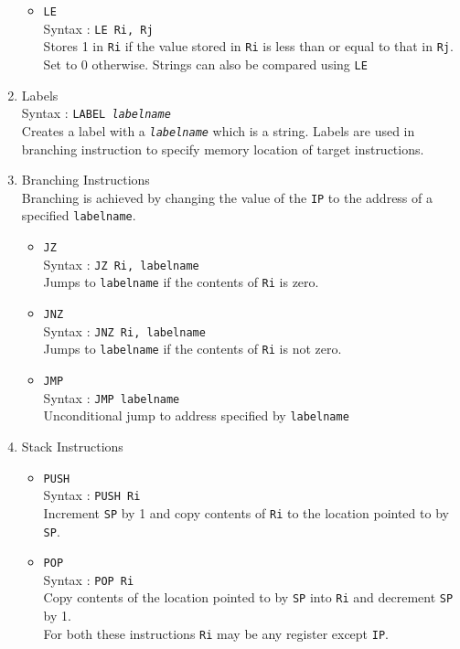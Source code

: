 \documentclass[11pt]{article}
\begin{document}
\begin{enumerate}
\begin{itemize}
\item \texttt{LE}\\
Syntax : \texttt{LE Ri, Rj}\\
Stores 1 in \texttt{Ri} if the value stored in \texttt{Ri} is less than or equal to that in \texttt{Rj}. Set to 0 otherwise. Strings can also be compared using \texttt{LE} \\
\end{itemize}

\item Labels \\
Syntax : \texttt{LABEL \textit{labelname}} \\
Creates a label with a \texttt{\textit{labelname}}  which is a string. Labels are used in branching instruction to specify memory location of target instructions.


\item Branching Instructions\\
Branching is achieved by changing the value of the \texttt{IP} to the address of a specified \texttt{labelname}. 
 
\begin{itemize}
\item \texttt{JZ}\\
Syntax : \texttt{JZ Ri, labelname}\\
Jumps to \texttt{labelname} if the contents of \texttt{Ri} is zero.
\item \texttt{JNZ}\\
Syntax : \texttt{JNZ Ri, labelname}\\
Jumps to \texttt{labelname} if the contents of \texttt{Ri} is not zero.
\item \texttt{JMP}\\
Syntax : \texttt{JMP labelname}\\
Unconditional jump to address specified by \texttt{labelname}\\

\end{itemize}

\item Stack Instructions
\begin{itemize}
\item \texttt{PUSH}\\
Syntax : \texttt{PUSH Ri}\\
Increment \texttt{SP} by 1 and copy contents of \texttt{Ri} to the location pointed to by \texttt{SP}.
\item \texttt{POP}\\
Syntax : \texttt{POP Ri}\\
Copy contents of the location pointed to by \texttt{SP} into \texttt{Ri} and decrement \texttt{SP} by 1.\\
For both these instructions \texttt{Ri} may be any register except \texttt{IP}.
\end{itemize}


\end{enumerate}
\end{document}
